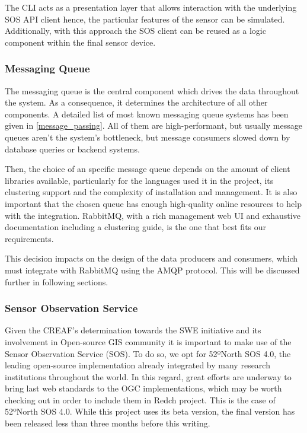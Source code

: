 The CLI acts as a presentation layer that allows interaction with the underlying SOS API client hence, the particular features of the sensor can be simulated. Additionally, with this approach the SOS client can be reused as a logic component within the final sensor device.

\subsubsection{Messaging Queue}

The messaging queue is the central component which drives the data throughout the system. As a consequence, it determines the architecture of all other components. A detailed list of most known messaging queue systems has been given in \ref{message_passing}. All of them are high-performant, but usually message queues aren't the system's bottleneck, but message consumers slowed down by database queries or backend systems.

Then, the choice of an specific message queue depends on the amount of client libraries available, particularly for the languages used it in the project, its clustering support and the complexity of installation and management. It is also important that the chosen queue has enough high-quality online resources to help with the integration. RabbitMQ, with a rich management web UI and exhaustive documentation including a clustering guide, is the one that best fits our requirements.

This decision impacts on the design of the data producers and consumers, which must integrate with RabbitMQ using the AMQP protocol. This will be discussed further in following sections.


\subsubsection{Sensor Observation Service}

Given the CREAF's determination towards the SWE initiative and its involvement in Open-source GIS community it is important to make use of the Sensor Observation Service (SOS). To do so, we opt for 52ºNorth SOS 4.0, the leading open-source implementation already integrated by many research institutions throughout the world. In this regard, great efforts are underway to bring last web standards to the OGC implementations, which may be worth checking out in order to include them in Redch project. This is the case of 52ºNorth SOS 4.0. While this project uses its beta version, the final version has been released less than three months before this writing.

